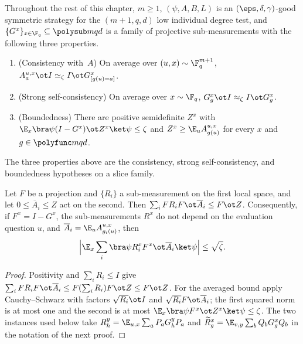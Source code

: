 Throughout the rest of this chapter, $m\ge1$, $(\psi,A,B,L)$ is an
$(\eps,\delta,\gamma)$-good symmetric strategy for the $(m+1,q,d)$ low
individual degree test, and $\{G^x\}_{x\in\F_q}\subseteq\polysub mqd$ is a
family of projective sub-measurements with the following three properties.
\begin{enumerate}
	\item (Consistency with~$A$) On average over $(u,x)\sim\F_q^{m+1}$,
	      $A^{u,x}_a\ot I\simeq_\zeta I\ot G^x_{[g(u)=a]}$.
	\item (Strong self-consistency) On average over $x\sim\F_q$,
	      $G^x_g\ot I\approx_\zeta I\ot G^x_g$.
	\item (Boundedness) There are positive semidefinite $Z^x$ with
	      $\E_x\bra\psi(I-G^x)\ot Z^x\ket\psi\le\zeta$ and
	      $Z^x\ge\E_uA^{u,x}_{g(u)}$ for every $x$ and $g\in\polyfunc mqd$.
\end{enumerate}

\begin{definition}\label{def:slice-family-hypotheses}
	\leanok
	The three properties above are the consistency, strong self-consistency,
	and boundedness hypotheses on a slice family.
\end{definition}

\begin{lemma}\label{lem:boundedness-rejection}
	\leanok
	Let $F$ be a projection and $\{R_i\}$ a sub-measurement on the first
	local space, and let $0\le\overline A_i\le Z$ act on the second.  Then
	$\sum_iFR_iF\ot\overline A_i\le F\ot Z$.  Consequently, if $F^x=I-G^x$,
	the sub-measurements $R^x$ do not depend on the evaluation question $u$,
	and $\overline A_i=\E_uA^{u,x}_{g_i(u)}$, then
	\[
		\Bigl|\E_x\sum_i\bra\psi R_i^xF^x\ot\overline A_i\ket\psi\Bigr|
		\le\sqrt\zeta.
	\]
\end{lemma}
\begin{proof}
	\leanok
	Positivity and $\sum_iR_i\le I$ give
	$\sum_iFR_iF\ot\overline A_i\le F(\sum_iR_i)F\ot Z\le F\ot Z$.  For the
	averaged bound apply Cauchy--Schwarz with factors $\sqrt{R_i}\ot I$ and
	$\sqrt{R_i}F\ot\overline A_i$; the first squared norm is at most one and
	the second is at most $\E_x\bra\psi F^x\ot Z^x\ket\psi\le\zeta$.  The two
	instances used below take $R^y_h=\E_{u,x}\sum_aP_aG^y_hP_a$ and
	$\widetilde R^x_g=\E_{v,y}\sum_bQ_bG^x_gQ_b$ in the notation of the next
	proof.
\end{proof}

